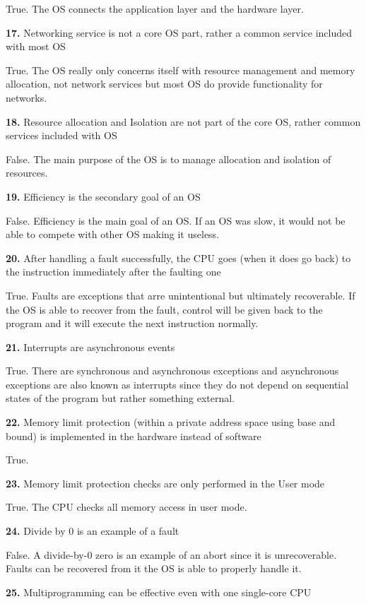 \documentclass[12pt]{article}
\begin{document}
True. The OS connects the application layer and the hardware layer. 

{\bf 17.} Networking service is not a core OS part, rather a common service included with most OS

True. The OS really only concerns itself with resource management and memory allocation, not network services but most OS do provide functionality for networks. 

{\bf 18.} Resource allocation and Isolation are not part of the core OS, rather common services
included with OS

False. The main purpose of the OS is to manage allocation and isolation of resources. 

{\bf 19.} Efficiency is the secondary goal of an OS

False. Efficiency is the main goal of an OS. If an OS was slow, it would not be able to compete with other OS making it useless. 

{\bf 20.} After handling a fault successfully, the CPU goes (when it does go back) to the instruction
immediately after the faulting one

True. Faults are exceptions that arre unintentional but ultimately recoverable. If the OS is able to recover from the fault, control will be given back to the program and it will execute the next instruction normally. 

{\bf 21.} Interrupts are asynchronous events

True. There are synchronous and asynchronous exceptions and asynchronous exceptions are also known as interrupts since they do not depend on sequential states of the program but rather something external. 

{\bf 22.} Memory limit protection (within a private address space using base and bound) is
implemented in the hardware instead of software

True. 

{\bf 23.} Memory limit protection checks are only performed in the User mode

True. The CPU checks all memory access in user mode. 

{\bf 24.} Divide by 0 is an example of a fault

False. A divide-by-0 zero is an example of an abort since it is unrecoverable. Faults can be recovered from it the OS is able to properly handle it. 

{\bf 25.} Multiprogramming can be effective even with one single-core CPU
\end{document}
